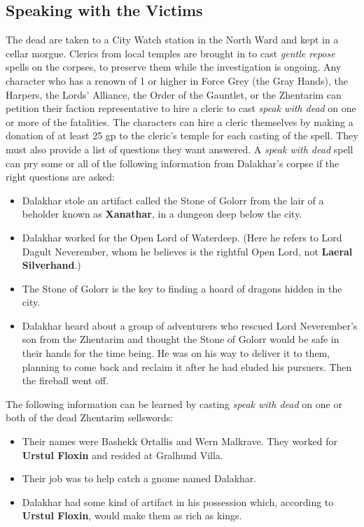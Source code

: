 \documentclass[10pt,a4paper,twoside,twocolumn,openany,nodeprecatedcode]{dndbook}
\begin{document}
\subsection{Speaking with the Victims}
The dead are taken to a City Watch station in the North Ward and kept in a cellar morgue. Clerics from local temples are brought in to cast \textit{gentle repose} spells on the corpses, to preserve them while the investigation is ongoing. Any character who has a renown of 1 or higher in Force Grey (the Gray Hands), the Harpers, the Lords' Alliance, the Order of the Gauntlet, or the Zhentarim can petition their faction representative to hire a cleric to cast \textit{speak with dead} on one or more of the fatalities.
The characters can hire a cleric themselves by making a donation of at least 25 gp to the cleric's temple for each casting of the spell. They must also provide a list of questions they want answered.
A \textit{speak with dead} spell can pry some or all of the following information from Dalakhar's corpse if the right questions are asked:
\begin{itemize}

\item Dalakhar stole an artifact called the Stone of Golorr from the lair of a beholder known as \textbf{Xanathar}, in a dungeon deep below the city.
\item Dalakhar worked for the Open Lord of Waterdeep. (Here he refers to Lord Dagult Neverember, whom he believes is the rightful Open Lord, not \textbf{Laeral Silverhand}.)
\item The Stone of Golorr is the key to finding a hoard of dragons hidden in the city.
\item Dalakhar heard about a group of adventurers who rescued Lord Neverember's son from the Zhentarim and thought the Stone of Golorr would be safe in their hands for the time being. He was on his way to deliver it to them, planning to come back and reclaim it after he had eluded his pursuers. Then the fireball went off.
\end{itemize}


The following information can be learned by casting \textit{speak with dead} on one or both of the dead Zhentarim sellswords:
\begin{itemize}

\item Their names were Bashekk Ortallis and Wern Malkrave. They worked for \textbf{Urstul Floxin} and resided at Gralhund Villa.
\item Their job was to help catch a gnome named Dalakhar.
\item Dalakhar had some kind of artifact in his possession which, according to \textbf{Urstul Floxin}, would make them as rich as kings.
\end{itemize}
\end{document}
